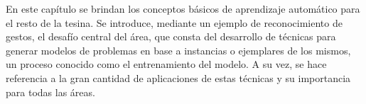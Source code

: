 %
%
%
%
%
%
%
%

En este capítulo se brindan los conceptos básicos de aprendizaje automático para el resto de la tesina. Se introduce, mediante un ejemplo de reconocimiento de gestos, el desafío central del área, que consta del desarrollo de técnicas para
generar modelos de problemas en base a instancias o ejemplares de los mismos, un proceso conocido como el entrenamiento del modelo. A su vez, se hace referencia a la gran cantidad de aplicaciones de estas técnicas y su importancia para todas las áreas.

